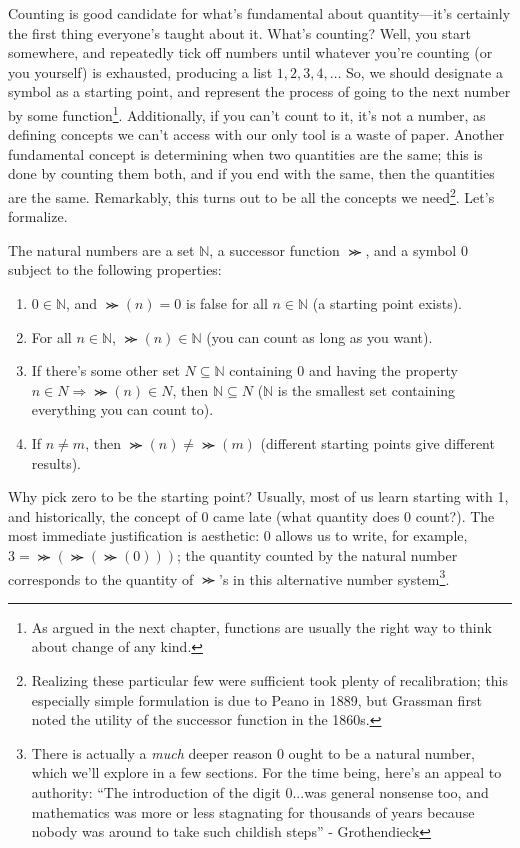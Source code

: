 Counting is good candidate for what's fundamental about quantity---it's certainly the first thing everyone's taught about it.
What's counting?
Well, you start somewhere, and repeatedly tick off numbers until whatever you're counting (or you yourself) is exhausted,
producing a list $1, 2, 3, 4, \ldots$
So, we should designate a symbol as a starting point, and represent the process of going to the next number by some function\footnote
{
  As argued in the next chapter, functions are usually the right way to think about change of any kind.
}.
Additionally, if you can't count to it, it's not a number, as defining concepts we can't access with our only tool is a waste of paper.
Another fundamental concept is determining when two quantities are the same; this is done by counting them both, and if you end with the same,
then the quantities are the same.
Remarkably, this turns out to be all the concepts we need\footnote
{
  Realizing these particular few were sufficient took plenty of recalibration; this especially simple formulation is due to Peano in 1889,
  but Grassman first noted the utility of the successor function in the 1860s.
}.
Let's formalize.
\begin{definition}
  The natural numbers are a set $\mathbb{N}$, a successor function $\Succ$, and a symbol $0$ subject to the following properties:
  \begin{enumerate}
  \item $0 \in \mathbb{N}$, and $\Succ(n) = 0$ is false for all $n \in \mathbb{N}$ (a starting point exists).
  \item For all $n \in \mathbb{N}$, $\Succ(n) \in \mathbb{N}$ (you can count as long as you want).
  \item If there's some other set $N \subseteq \mathbb{N}$ containing 0 and having the property $n \in N \Rightarrow \Succ(n) \in N$,
    then $\mathbb{N} \subseteq N$ ($\mathbb{N}$ is the smallest set containing everything you can count to).
  \item If $n \neq m$, then $\Succ(n) \neq \Succ(m)$ (different starting points give different results). %
  \end{enumerate}
\end{definition}
Why pick zero to be the starting point?
Usually, most of us learn starting with 1, and historically, the concept of 0 came late (what quantity does 0 count?).
The most immediate justification is aesthetic: 0 allows us to write, for example, $3 = \Succ(\Succ(\Succ(0)))$;
the quantity counted by the natural number corresponds to the quantity of $\Succ$'s in this alternative number system\footnote
{
  There is actually a \textit{much} deeper reason 0 ought to be a natural number, which we'll explore in a few sections.
  For the time being, here's an appeal to authority: ``The introduction of the digit 0...was general nonsense too,
  and mathematics was more or less stagnating for thousands of years because nobody was around to take such childish steps'' - Grothendieck
}.

